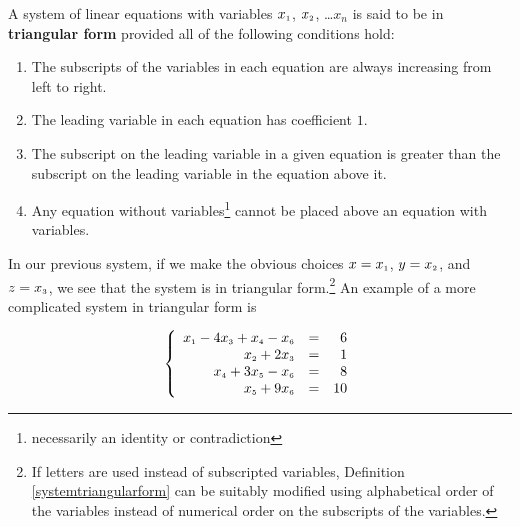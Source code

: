 \smallskip
\colorbox{ResultColor}{\bbm  \begin{defn} \label{systemtriangularform} A system of linear equations with variables $x_{\mbox{\tiny$1$}}$, $x_{\mbox{\tiny$2$}}$, \ldots $x_{n}$ is said to be in   \textbf{triangular form} provided all of the following conditions hold:

\begin{enumerate}

\item  The subscripts of the variables in each equation are always increasing from left to right.

\item  The leading variable in each equation has coefficient $1$.

\item  The subscript on the leading variable in a given equation is greater than the subscript on the leading variable in the equation above it.

\item  Any equation without variables\footnote{necessarily an identity or contradiction} cannot be placed above an equation with variables.

\end{enumerate}

\end{defn}

\ebm}

\smallskip

In our previous system, if we make the obvious choices $x = x_{\mbox{\tiny$1$}}$, $y = x_{\mbox{\tiny$2$}}$, and $z = x_{\mbox{\tiny$3$}}$, we see that the system is in triangular form.\footnote{If letters are used instead of subscripted variables, Definition \ref{systemtriangularform} can be suitably modified using alphabetical order of the variables instead of numerical order on the subscripts of the variables.}   An example of a more complicated system in triangular form is

\[ \left\{ \begin{array}{rcr} x_{\mbox{\tiny$1$}} - 4x_{\mbox{\tiny$3$}} + x_{\mbox{\tiny$4$}} - x_{\mbox{\tiny$6$}} & = & 6 \\ x_{\mbox{\tiny$2$}} + 2x_{\mbox{\tiny$3$}} & = & 1 \\ x_{\mbox{\tiny$4$}} + 3x_{\mbox{\tiny$5$}} - x_{\mbox{\tiny$6$}} & = & 8 \\ x_{\mbox{\tiny$5$}} + 9x_{\mbox{\tiny$6$}} & = & 10 \end{array} \right.\]


